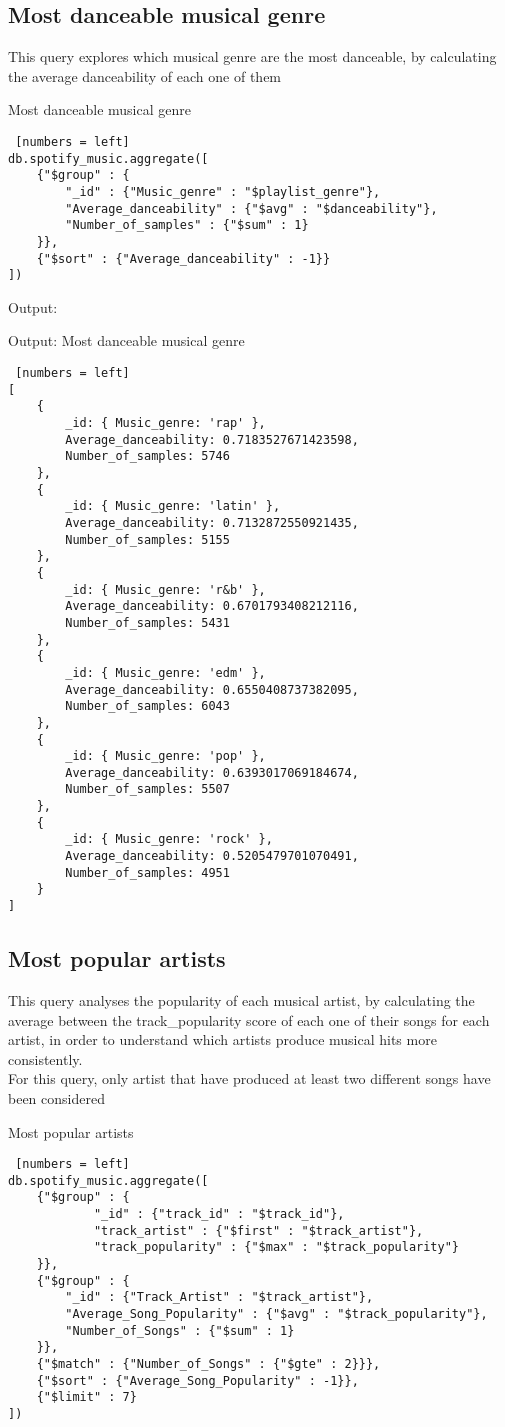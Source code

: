 \subsection{Most danceable musical genre}
This query explores which musical genre are the most danceable, by calculating the average danceability of each one of them\\
\begin{algorithm}[ht]
\caption{Most danceable musical genre}
\begin{lstlisting} [numbers = left]
db.spotify_music.aggregate([
	{"$group" : {
		"_id" : {"Music_genre" : "$playlist_genre"},
		"Average_danceability" : {"$avg" : "$danceability"},
		"Number_of_samples" : {"$sum" : 1}
	}},
  	{"$sort" : {"Average_danceability" : -1}}
])
\end{lstlisting}
\end{algorithm}
\newpage

Output:
\begin{algorithm}[ht]
\caption{Output: Most danceable musical genre}
\begin{lstlisting} [numbers = left]
[
	{
		_id: { Music_genre: 'rap' },
		Average_danceability: 0.7183527671423598,
		Number_of_samples: 5746
	},
	{
		_id: { Music_genre: 'latin' },
		Average_danceability: 0.7132872550921435,
		Number_of_samples: 5155
	},
	{
		_id: { Music_genre: 'r&b' },
		Average_danceability: 0.6701793408212116,
		Number_of_samples: 5431
	},
	{
		_id: { Music_genre: 'edm' },
		Average_danceability: 0.6550408737382095,
		Number_of_samples: 6043
	},
	{
		_id: { Music_genre: 'pop' },
		Average_danceability: 0.6393017069184674,
		Number_of_samples: 5507
	},
	{
		_id: { Music_genre: 'rock' },
		Average_danceability: 0.5205479701070491,
		Number_of_samples: 4951
	}
]
\end{lstlisting}
\end{algorithm}
\newpage
\subsection{Most popular artists}
This query analyses the popularity of each musical artist, by calculating the average between the track\_popularity score of each one of their songs for each artist, in order to understand which artists produce musical hits more consistently.\\
For this query, only artist that have produced at least two different songs have been considered
\begin{algorithm}[ht]
\caption{Most popular artists}
\begin{lstlisting} [numbers = left]
db.spotify_music.aggregate([
	{"$group" : {
			"_id" : {"track_id" : "$track_id"},
			"track_artist" : {"$first" : "$track_artist"}, 
			"track_popularity" : {"$max" : "$track_popularity"}
	}},
	{"$group" : {
		"_id" : {"Track_Artist" : "$track_artist"},
		"Average_Song_Popularity" : {"$avg" : "$track_popularity"},
		"Number_of_Songs" : {"$sum" : 1}
	}},
	{"$match" : {"Number_of_Songs" : {"$gte" : 2}}},
	{"$sort" : {"Average_Song_Popularity" : -1}},
	{"$limit" : 7}
])
\end{lstlisting}
\end{algorithm}
\newpage

